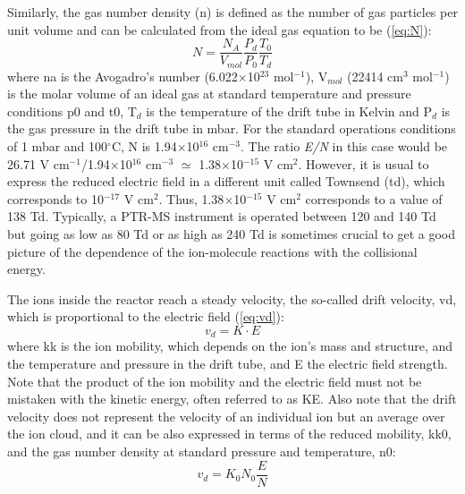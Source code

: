 Similarly, the gas number density (\acrshort{n})  is defined as the number of gas particles per unit volume and can be calculated from the ideal gas equation to be (\autoref{eq:N}):
\begin{equation}
N = \frac{N_A}{V_{mol}}\frac{P_d}{P_0}\frac{T_0}{T_d}
\label{eq:N}
\end{equation}
where \acrshort{na} is the Avogadro's number (6.022$\times$10$^{23}$ mol$^{-1}$), V$_{mol}$ (22414 cm$^{3}$ mol$^{-1}$) is the molar volume of an ideal gas at standard temperature and pressure conditions \acrshort{p0}  and \acrshort{t0}, T$_d$ is the temperature of the drift tube in Kelvin and P$_d$ is the gas pressure in the drift tube in mbar.
For the standard operations conditions of 1 mbar and 100$^{\circ}$C, N is 1.94$\times$10$^{16}$ cm$^{-3}$.
The ratio \textit{E/N} in this case would be 26.71 V cm$^{-1}$/1.94$\times$10$^{16}$ cm$^{-3}$ $\simeq$ 1.38$\times$10$^{-15}$ V cm$^{2}$.
However, it is usual to express the reduced electric field in a different unit called Townsend (\acrshort{td}), which corresponds to 10$^{-17}$ V cm$^{2}$.
Thus, 1.38$\times$10$^{-15}$ V cm$^{2}$ corresponds to a value of 138 Td.
Typically, a PTR-MS instrument is operated between 120 and 140 Td but going as low as 80 Td or as high as 240 Td is sometimes crucial to get a good picture of the dependence of the ion-molecule reactions with the collisional energy.

The ions inside the reactor reach a steady velocity, the so-called drift velocity, \acrshort{vd}, which is proportional to the electric field (\autoref{eq:vd}):
\begin{equation}
v_d = K\cdot E
\label{eq:vd}
\end{equation}
where \acrshort{kk} is the ion mobility, which depends on the ion's mass and structure, and the temperature and pressure in the drift tube, and E the electric field strength.
Note that the product of the ion mobility and the electric field must not be mistaken with the kinetic energy, often referred to as KE.
Also note that the drift velocity does not represent the velocity of an individual ion but an average over the ion cloud, and it can be also  expressed in terms of the reduced mobility, \acrshort{kk0}, and the gas number density at standard pressure and temperature, \acrshort{n0}:
\begin{equation}
v_d = K_0 N_0 \frac{E}{N}
\label{eq:vd2}
\end{equation}


